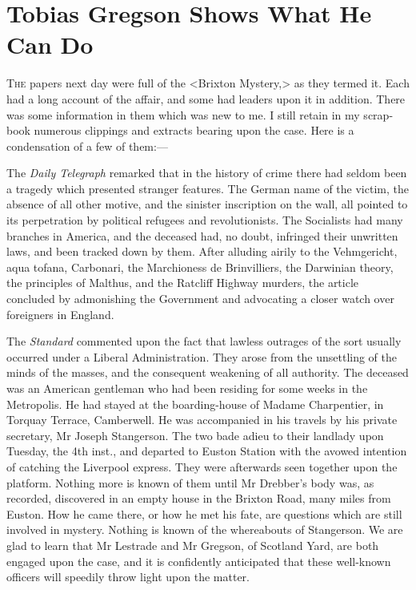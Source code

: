 \chapter{Tobias Gregson Shows What He Can Do}
\lettrine{T}{he} papers next day were full of the <Brixton Mystery,> as they termed it. Each had a long account of the affair, and some had leaders upon it in addition. There was some information in them which was new to me. I still retain in my scrap-book numerous clippings and extracts bearing upon the case. Here is a condensation of a few of them:—

The \textit{Daily Telegraph} remarked that in the history of crime there had seldom been a tragedy which presented stranger features. The German name of the victim, the absence of all other motive, and the sinister inscription on the wall, all pointed to its perpetration by political refugees and revolutionists. The Socialists had many branches in America, and the deceased had, no doubt, infringed their unwritten laws, and been tracked down by them. After alluding airily to the Vehmgericht, aqua tofana, Carbonari, the Marchioness de Brinvilliers, the Darwinian theory, the principles of Malthus, and the Ratcliff Highway murders, the article concluded by admonishing the Government and advocating a closer watch over foreigners in England.

The \textit{Standard} commented upon the fact that lawless outrages of the sort usually occurred under a Liberal Administration. They arose from the unsettling of the minds of the masses, and the consequent weakening of all authority. The deceased was an American gentleman who had been residing for some weeks in the Metropolis. He had stayed at the boarding-house of Madame Charpentier, in Torquay Terrace, Camberwell. He was accompanied in his travels by his private secretary, Mr Joseph Stangerson. The two bade adieu to their landlady upon Tuesday, the 4th inst., and departed to Euston Station with the avowed intention of catching the Liverpool express. They were afterwards seen together upon the platform. Nothing more is known of them until Mr Drebber's body was, as recorded, discovered in an empty house in the Brixton Road, many miles from Euston. How he came there, or how he met his fate, are questions which are still involved in mystery. Nothing is known of the whereabouts of Stangerson. We are glad to learn that Mr Lestrade and Mr Gregson, of Scotland Yard, are both engaged upon the case, and it is confidently anticipated that these well-known officers will speedily throw light upon the matter.

